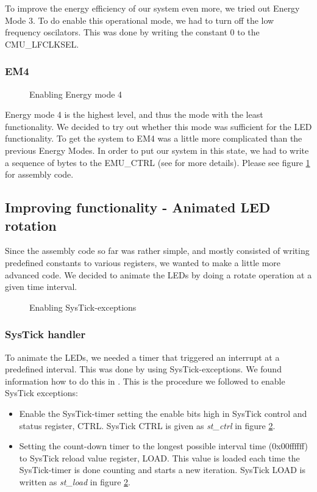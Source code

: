 		To improve the energy efficiency of our system even more, we tried out Energy Mode 3. To do enable this operational mode, we had to turn off the low frequency oscilators. This was done by writing the constant $0$ to the CMU\_LFCLKSEL.
	
		\subsubsection{EM4}
		\label{subsubsection:em4}
	
		\begin{figure}[t]
			
			\caption{Enabling Energy mode 4}
			\label{code:em4}
		\end{figure}

		Energy mode 4 is the highest level, and thus the mode with the least functionality. We decided to try out whether this mode was sufficient for the LED functionality. To get the system to EM4 was a little more complicated than the previous Energy Modes. In order to put our system in this state, we had to write a sequence of bytes to the EMU\_CTRL (see \cite[p.~112]{reference_manual} for more details). Please see figure \ref{code:em4} for assembly code.

	
	\subsection{Improving functionality - Animated LED rotation}
	Since the assembly code so far was rather simple, and mostly consisted of writing predefined constants to various registers, we wanted to make a little more advanced code. We decided to animate the LEDs by doing a rotate operation at a given time interval.
	
\begin{figure}[t]
		
		\caption{Enabling SysTick-exceptions}
		\label{code:systick_enable}
\end{figure}

	\subsubsection{SysTick handler}
	To animate the LEDs, we needed a timer that triggered an interrupt at a predefined interval. This was done by using SysTick-exceptions. We found information how to do this in \cite[section 4.4]{cortex_m3_ref_man}. This is the procedure we followed to enable SysTick exceptions:
	\begin{itemize}
	\item Enable the SysTick-timer setting the enable bits high in SysTick control and status register, CTRL. SysTick CTRL is given as \emph{st\_ctrl} in figure \ref{code:systick_enable}.
	\item Setting the count-down timer to the longest possible interval time (0x00ffffff) to SysTick reload value register, LOAD. This value is loaded each time the SysTick-timer is done counting and starts a new iteration. SysTick LOAD is written as \emph{st\_load} in figure \ref{code:systick_enable}.
	\end{itemize}
	

